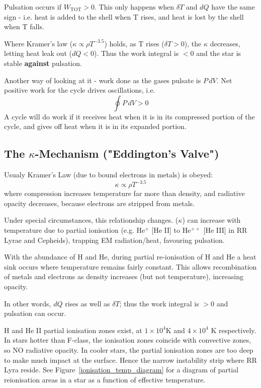 \documentclass{spy}
\begin{document}
Pulsation occurs if \(W_\mathrm{TOT} > 0\). This only happens when \(\delta T \) and \(dQ\) have the same sign - i.e. heat is added to the shell when T rises, and heat is lost by the shell when T falls. 


Where Kramer's law (\(\kappa \propto \rho T^{-3.5}\)) holds, as T rises (\(\delta T > 0\)), the \(\kappa\) decreases, letting heat leak out (\(dQ<0\)). Thus the work integral is \(<0\) and the star is stable \textbf{against} pulsation. 

Another way of looking at it - work done as the gases pulsate is \(P \,dV\). Net positive work for the cycle drives oscillations, i.e.
\begin{equation}
    \oint P \,dV > 0
\end{equation}
A cycle will do work if it receives heat when it is in its compressed portion of the cycle, and gives off heat when it is in its expanded portion.


\subsection{The \(\kappa\)-Mechanism ("Eddington's Valve")}
Usualy Kramer's Law (due to bound electrons in metals) is obeyed:
\begin{equation}
    \kappa \propto \rho T^{-3.5}
\end{equation}
where compression increases temperature far more than density, and radiative opacity decreases, because electrons are stripped from metals. 

Under special circumstances, this relationship changes. (\(\kappa\)) can increase with temperature due to partial ionisation (e.g. He\(^+\) [He II] to He\(^{++}\) [He III] in RR Lyrae and Cepheids), trapping EM radiation/heat, favouring pulsation.  

With the abundance of H and He, during partial re-ionisation of H and He a heat sink occurs where temperature remains fairly constant. This allows recombination of metals and electrons as density increases (but not temperature), increasing opacity. 

In other words, \(dQ\) rises as well as \(\delta T\); thus the work integral is \(>0\) and pulsation can occur.

H and He II partial ionisation zones exist, at \(1 \times 10^4\)K and \(4 \times 10^4\) K respectively. In stars hotter than F-class, the ionisation zones coincide with convective zones, so NO radiative opacity. In cooler stars, the partial ionisation zones are too deep to make much impact at the surface. Hence the narrow instability strip where RR Lyra reside. See Figure~\ref{ionisation_temp_diagram} for a diagram of partial reionisation areas in a star as a function of effective temperature. 
\end{document}
